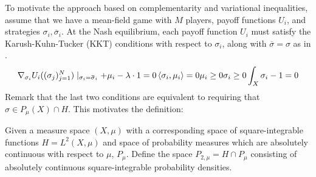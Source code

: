 To motivate the approach based on complementarity and variational inequalities, assume that we have a mean-field game with $M$ players, payoff functions $U_i$, and strategies $\sigma_i, \overbar{\sigma}_i$. At the Nash equilibrium, each payoff function $U_i$ must satisfy the Karush-Kuhn-Tucker (KKT) conditions with respect to $\sigma_i$, along with $\overbar{\sigma}=\sigma$ as in .
\begin{align}
  \nabla_{\sigma_i}U_i((\sigma_j)_{j=1}^N) \mid_{\sigma_i = \overbar{\sigma}_i}  + \mu_i - \lambda \cdot 1 = 0
  \ip{\sigma_i}{\mu_i} = 0
  \mu_i \geq 0
  \sigma_i \geq 0
  \int_X \sigma_i - 1 = 0
\end{align}
Remark that the last two conditions are equivalent to requiring that $\sigma \in P_{\mu}(X) \cap H$. This motivates the definition:
\begin{definition}
  Given a measure space $(X,\mu)$ with a corresponding space of square-integrable functions $H=L^2(X,\mu)$ and space of probability measures which are absolutely continuous with respect to $\mu$, $P_{\mu}$. Define the space $P_{2,\mu}=H \cap P_{\mu}$ consisting of absolutely continuous square-integrable probability densities.
\end{definition}

